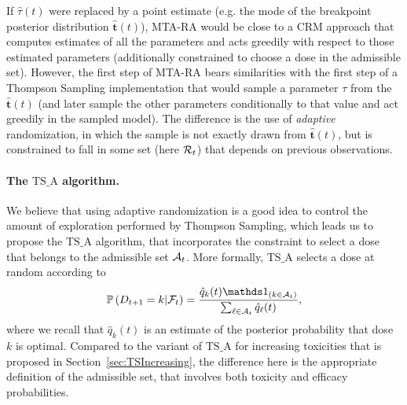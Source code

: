 If $\hat{\tau}(t)$ were replaced by a point estimate (e.g. the mode of the breakpoint posterior distribution $\bm{\hat t}(t)$), MTA-RA would be close to a CRM approach that computes estimates of all the parameters and acts greedily with respect to those estimated parameters (additionally constrained to choose a dose in the admissible set). However, the first step of MTA-RA bears similarities with the first step of a Thompson Sampling implementation that would sample a parameter $\tau$ from the $\bm{\hat t}(t)$ (and later sample the other parameters conditionally to that value and act greedily in the sampled model). The difference is the use of \emph{adaptive} randomization, in which the sample is not exactly drawn from $\bm{\hat t}(t)$, but is constrained to fall in some set (here $\mathcal{R}_t$) that depends on previous observations. 

\paragraph{The $\bm{\mathrm{TS}\_\mathrm{A}}$ algorithm.} We believe that using adaptive randomization is a good idea to control the amount of exploration performed by Thompson Sampling, which leads us to propose the $\mathrm{TS}\_\mathrm{A}$ algorithm, that incorporates the constraint to select a dose that belongs to the admissible set $\mathcal{A}_t$. More formally, $\mathrm{TS}\_\mathrm{A}$ selects a dose at random according to   
\[\bP\left(D_{t+1} = k | \cF_{t}\right) = \frac{\hat{q}_k(t) \ind_{\left(k \in \cA_t\right)}}{\sum_{\ell \in \cA_t} \hat{q}_{\ell}(t)},\]
where we recall that $\hat{q}_k(t)$ is an estimate of the posterior probability that dose $k$ is optimal. Compared to the variant of $\mathrm{TS}\_\mathrm{A}$  for increasing toxicities that is proposed in Section~\ref{sec:TSIncreasing}, the difference here is the appropriate definition of the admissible set, that involves both toxicity and efficacy probabilities.


% 



